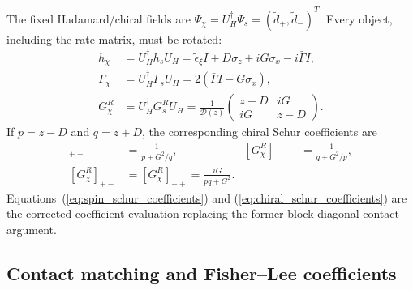 \documentclass[%
  aps,physrev,onecolumn,10pt,amsmath,amssymb,superscriptaddress,longbibliography,floatfix
]{revtex4-2}
\newcommand{\teps}{\tilde{\epsilon}_{\xi}}
\begin{document}
The fixed Hadamard/chiral fields are $\Psi_\chi=U_H^\dagger\Psi_s=(\widetilde d_+,\widetilde d_-)^T$.
Every object, including the rate matrix, must be rotated:
\begin{align}
h_\chi&=U_H^\dagger h_sU_H
=\teps I+D\sigma_z+iG\sigma_x-i\bar\Gamma I,\nonumber\\
\Gamma_\chi&=U_H^\dagger\Gamma_sU_H
=2(\bar\Gamma I-G\sigma_x),\nonumber\\
G_\chi^R&=U_H^\dagger G_s^RU_H
=\frac{1}{\mathcal D(z)}
\begin{pmatrix}
z+D&iG\\ iG&z-D
\end{pmatrix}.
\label{eq:chiral_kernel_rate_green}
\end{align}
If $p=z-D$ and $q=z+D$, the corresponding chiral Schur coefficients are
\begin{align}
[G_\chi^R]_{++}
&=\frac{1}{p+G^2/q},&
[G_\chi^R]_{--}
&=\frac{1}{q+G^2/p},\nonumber\\
[G_\chi^R]_{+-}
&=[G_\chi^R]_{-+}
=\frac{iG}{pq+G^2}.
\label{eq:chiral_schur_coefficients}
\end{align}
Equations~(\ref{eq:spin_schur_coefficients}) and
(\ref{eq:chiral_schur_coefficients}) are the corrected coefficient
evaluation replacing the former block-diagonal contact argument.

\subsection{Contact matching and Fisher--Lee coefficients}
\end{document}
